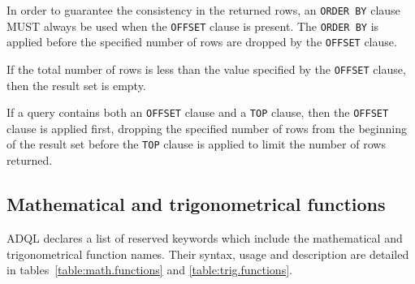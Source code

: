 \documentclass[11pt,a4paper]{ivoa}
\begin{document}
In order to guarantee the consistency in the returned rows, an \texttt{ORDER BY}
clause MUST always be used when the \texttt{OFFSET} clause is present. The
\texttt{ORDER BY} is applied before the specified number of rows are dropped by
the \texttt{OFFSET} clause.
%

If the total number of rows is less than the value
specified by the \texttt{OFFSET} clause, then the result set is empty.

If a query contains both an \texttt{OFFSET} clause and a \texttt{TOP} clause,
then the \texttt{OFFSET} clause is applied first, dropping the specified
number of rows from the beginning of the result set before the
\texttt{TOP} clause is applied to limit the number of rows returned.

\subsection{Mathematical and trigonometrical functions}
\label{sec:math.functions}

ADQL declares a list of reserved keywords  which include
the mathematical and trigonometrical function names. Their syntax,
usage and description are detailed in tables~\ref{table:math.functions}
and \ref{table:trig.functions}.
\end{document}
